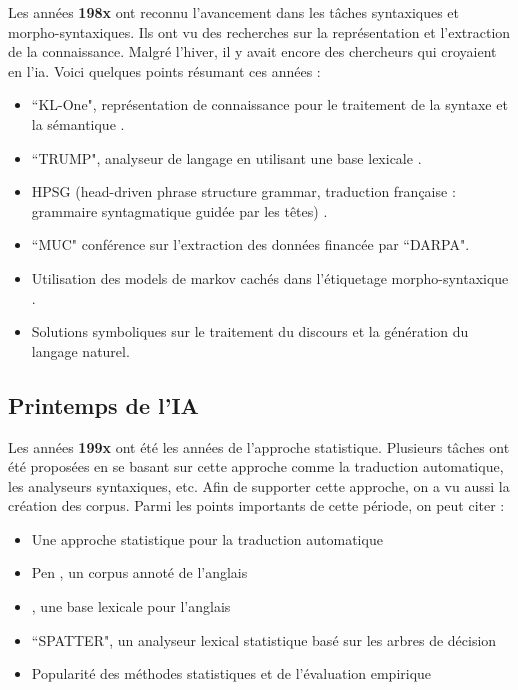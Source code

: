 \documentclass{KodeBook}
\begin{document}
Les années \textbf{198x} ont reconnu l'avancement dans les tâches syntaxiques et morpho-syntaxiques. 
Ils ont vu des recherches sur la représentation et l'extraction de la connaissance. 
Malgré l'hiver, il y avait encore des chercheurs qui croyaient en l'\ac{ia}. 
Voici quelques points résumant ces années :
\begin{itemize}
	\item {} ``KL-One", représentation de connaissance pour le traitement de la syntaxe et la sémantique \cite{1980-bobrow}.
	\item {} ``TRUMP", analyseur de langage en utilisant une base lexicale \cite{1986-jacobs}.
	\item {} HPSG (head-driven phrase structure grammar, traduction française : grammaire syntagmatique guidée par les têtes) \cite{1987-sag-pollard}.
	\item {} ``MUC" conférence sur l'extraction des données financée par ``DARPA".
	\item {} Utilisation des models de markov cachés dans  l'étiquetage morpho-syntaxique \cite{1988-church}.
	\item Solutions symboliques sur le traitement du discours et la génération du langage naturel.
\end{itemize}

\subsection{Printemps de l'IA}

Les années \textbf{199x} ont été les années de l'approche statistique. 
Plusieurs tâches ont été proposées en se basant sur cette approche comme la traduction automatique, les analyseurs syntaxiques, etc. 
Afin de supporter cette approche, on a vu aussi la création des corpus. 
Parmi les points importants de cette période, on peut citer :
\begin{itemize}
	\item {} Une approche statistique pour la traduction automatique \cite{1990-brown-al}
	\item {} Pen , un corpus annoté de l'anglais \cite{1993-marcus-al}
	\item {} , une base lexicale pour l'anglais \cite{1995-miller}
	\item {} ``SPATTER", un analyseur lexical statistique basé sur les arbres de décision \cite{1996-magerman}
	\item Popularité des méthodes statistiques et de l'évaluation empirique
\end{itemize}
\end{document}

